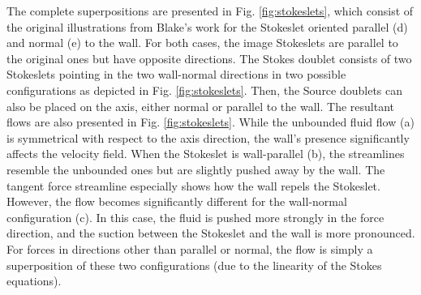 \documentclass{master_thesis}
\begin{document}
The complete superpositions are presented in Fig. \ref{fig:stokeslets}, which consist of the original illustrations from Blake's work \cite{blake1971} for the Stokeslet oriented parallel (d) and normal (e) to the wall. For both cases, the image Stokeslets are parallel to the original ones but have opposite directions. The Stokes doublet consists of two Stokeslets pointing in the two wall-normal directions in two possible configurations as depicted in Fig. \ref{fig:stokeslets}. Then, the Source doublets can also be placed on the axis, either normal or parallel to the wall. The resultant flows are also presented in Fig. \ref{fig:stokeslets}. While the unbounded fluid flow (a) is symmetrical with respect to the axis direction, the wall's presence significantly affects the velocity field. When the Stokeslet is wall-parallel (b), the streamlines resemble the unbounded ones but are slightly pushed away by the wall. The tangent force streamline especially shows how the wall repels the Stokeslet. However, the flow becomes significantly different for the wall-normal configuration (c). In this case, the fluid is pushed more strongly in the force direction, and the suction between the Stokeslet and the wall is more pronounced. For forces in directions other than parallel or normal, the flow is simply a superposition of these two configurations (due to the linearity of the Stokes equations).
\end{document}
